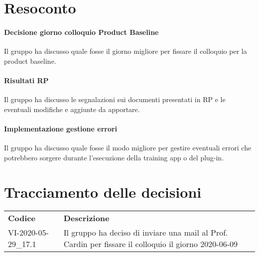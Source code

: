 \documentclass{article}
\begin{document}
\section{Resoconto}%
\label{resoconto}
\paragraph*{Decisione giorno colloquio Product Baseline}
Il gruppo ha discusso quale fosse il giorno migliore per fissare il colloquio per la product baseline.
\paragraph*{Risultati RP}
Il gruppo ha discusso le segnalazioni sui documenti presentati in RP e le eventuali modifiche e aggiunte da apportare.
\paragraph*{Implementazione gestione errori}
Il gruppo ha discusso quale fosse il modo migliore per gestire eventuali errori che potrebbero sorgere durante l'esecuzione della training app o del plug-in.

\section{Tracciamento delle decisioni}
\begin{table}[H]
  \centering
  \begin{tabular}{p{4cm}|p{12cm}}
    \rowcolor{lightgray}
    \textbf{Codice}  & \textbf{Descrizione}      \\
    VI-2020-05-29\_17.1 & Il gruppo ha deciso di inviare una mail al Prof. Cardin per fissare il colloquio il giorno 2020-06-09 \\
  \end{tabular}
\end{table}
\end{document}
